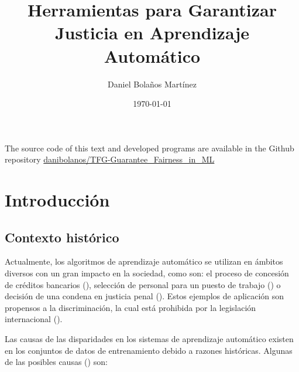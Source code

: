 \documentclass[oneside,openright,titlepage,numbers=noenddot,openany,headinclude,footinclude=true,
cleardoublepage=empty,abstractoff,BCOR=5mm,paper=a4,fontsize=12pt,main=spanish]{scrreprt}
\author{Daniel Bolaños Martínez}
\date{\today}
\title{Herramientas para Garantizar \\Justicia en Aprendizaje Automático}
\begin{document}
\maketitle



\newpage
\vspace*{\fill}
\doclicenseThis
The source code of this text and developed programs are available in the Github repository \href{https://github.com/danibolanos/TFG-Guarantee_Fairness_in_ML.git}{danibolanos/TFG-Guarantee\_Fairness\_in\_ML}









\tableofcontents


\chapter{Introducción}

\section{Contexto histórico}

Actualmente, los algoritmos de aprendizaje automático se utilizan en ámbitos diversos con un gran impacto en la sociedad, como son: el proceso de concesión de créditos bancarios (\cite{prestamo2018}), selección de personal para un puesto de trabajo (\cite{contratar2015}) o decisión de una condena en justicia penal (\cite{condena2016}). Estos ejemplos de aplicación son propensos a la discriminación, la cual está prohibida por la legislación internacional (\cite{ley1964}). 

Las causas de las disparidades en los sistemas de aprendizaje automático existen en los conjuntos de datos de entrenamiento debido a razones históricas. Algunas de las posibles causas (\cite{bigdata2016}) son:
\end{document}
